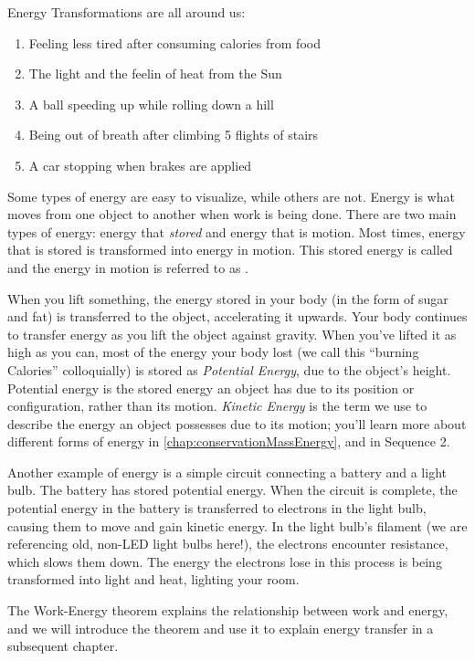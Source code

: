 Energy Transformations are all around us:
\begin{enumerate}
\item Feeling less tired after consuming calories from food
\item The light and the feelin of heat from the Sun
\item A ball speeding up while rolling down a hill
\item Being out of breath after climbing 5 flights of stairs
\item A car stopping when brakes are applied
\end{enumerate}

Some types of energy are easy to visualize, while others are not. Energy is what  moves from one object to another when work is being done.
There are two main types of energy: energy that \emph{stored} and energy that is motion. Most times, energy that is stored is transformed into energy in motion. This stored energy is called  and the energy in motion is referred to as . 

When you lift something, the energy stored in your body (in the form of sugar and fat) is 
transferred to the object, accelerating it upwards. Your body continues to 
transfer energy as you lift the object against gravity. When you've lifted it as high as you can, most of the energy your body lost (we call this ``burning Calories'' colloquially) is stored as \textit{Potential Energy}, due to the object's height. Potential energy is the stored energy an object has due to its position or configuration, rather than its motion. \textit{Kinetic Energy} is the term we use to describe the energy an object possesses due to its motion; you'll learn more about different forms of energy in \ref{chap:conservationMassEnergy}, and in Sequence 2.

Another example of energy is a simple circuit connecting a battery and a light bulb. The battery has stored potential energy. When the circuit is complete, the potential energy in the battery is transferred to electrons in the light bulb, causing them to move and gain kinetic energy. In the light bulb's filament (we are referencing old, non-LED light bulbs here!), the electrons encounter resistance, which slows them down. The energy the electrons lose in this process is being transformed into 
light and heat, lighting your room. 

The Work-Energy theorem explains the relationship between work and energy, and we will introduce the theorem and use it to explain energy transfer in a subsequent chapter. 

